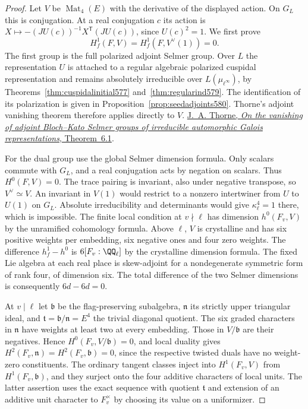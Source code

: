 \documentclass[a4paper,11pt]{article}
\theoremstyle{definition}
\theoremstyle{remark}
\numberwithin{equation}{section}
\begin{document}
\begin{proof}
Let \(V\) be \(\operatorname{Mat}_4(E)\) with the derivative
of the displayed action. On \(G_L\) this is conjugation.
At a real conjugation \(c\) its action is
\(X\mapsto-(JU(c))^{-1}X^{\mathsf T}(JU(c))\), since
\(U(c)^2=1\). We first prove
\[
          H^1_f(F,V)=H^1_f(F,V^\vee(1))=0 .
\]
The first group is the full polarized adjoint Selmer group.
Over \(L\) the representation \(U\) is attached to a regular
algebraic polarized cuspidal representation and remains
absolutely irreducible over \(L(\mu_{\ell^\infty})\), by
Theorems~\ref{thm:cuspidalinitial577} and~\ref{thm:regularind579}.
The identification of its polarization is given in
Proposition~\ref{prop:seedadjoints580}. Thorne's adjoint
vanishing theorem therefore applies directly to \(V\).
\href{https://arxiv.org/pdf/2207.04925}{J.~A. Thorne,
\emph{On the vanishing of adjoint Bloch--Kato Selmer groups
of irreducible automorphic Galois representations}, Theorem~6.1}.

For the dual group use the global Selmer dimension formula.
Only scalars commute with \(G_L\), and a real conjugation
acts by negation on scalars. Thus \(H^0(F,V)=0\). The trace
pairing is invariant, also under negative transpose, so
\(V^\vee\simeq V\). An invariant in \(V(1)\) would restrict
to a nonzero intertwiner from \(U\) to \(U(1)\) on \(G_L\).
Absolute irreducibility and determinants would give
\(\kappa_\ell^4=1\) there, which is impossible. The finite
local condition at \(v\nmid\ell\) has dimension \(h^0(F_v,V)\)
by the unramified cohomology formula. Above \(\ell\), \(V\)
is crystalline and has six positive weights per embedding,
six negative ones and four zero weights. The difference
\(h^1_f-h^0\) is \(6[F_v:\QQ_\ell]\) by the crystalline
dimension formula. The fixed Lie algebra at each real place
is skew-adjoint for a nondegenerate symmetric form of rank
four, of dimension six. The total difference of the two
Selmer dimensions is consequently \(6d-6d=0\).
\cite{XII-IX-V-milne98,XII-IX-VI-bk117}

At \(v\mid\ell\) let \(\mathfrak b\) be the flag-preserving
subalgebra, \(\mathfrak n\) its strictly upper triangular
ideal, and \(\mathfrak t=\mathfrak b/\mathfrak n=E^4\) the
trivial diagonal quotient. The six graded characters in
\(\mathfrak n\) have weights at least two at every embedding.
Those in \(V/\mathfrak b\) are their negatives. Hence
\(H^0(F_v,V/\mathfrak b)=0\), and local duality gives
\(H^2(F_v,\mathfrak n)=H^2(F_v,\mathfrak b)=0\), since
the respective twisted duals have no weight-zero constituents.
The ordinary tangent classes inject into \(H^1(F_v,V)\)
from \(H^1(F_v,\mathfrak b)\), and they surject onto the
four additive characters of local units. The latter
assertion uses the exact sequence with quotient \(\mathfrak t\)
and extension of an additive unit character to \(F_v^\times\)
by choosing its value on a uniformizer.


\end{proof}
\end{document}
